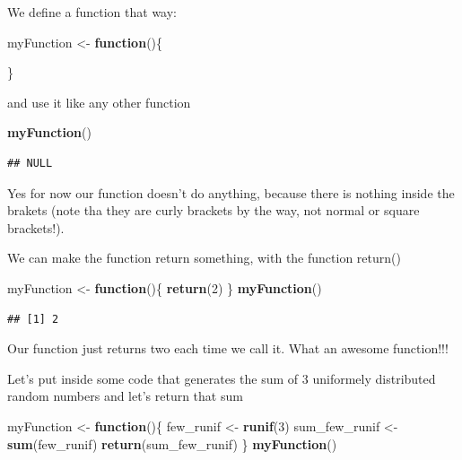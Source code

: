 \documentclass[]{book}
\newenvironment{Shaded}{\begin{snugshade}}{\end{snugshade}}
\newcommand{\ControlFlowTok}[1]{\textcolor[rgb]{0.13,0.29,0.53}{\textbf{#1}}}
\newcommand{\DecValTok}[1]{\textcolor[rgb]{0.00,0.00,0.81}{#1}}
\newcommand{\KeywordTok}[1]{\textcolor[rgb]{0.13,0.29,0.53}{\textbf{#1}}}
\newcommand{\NormalTok}[1]{#1}
\newcommand{\StringTok}[1]{\textcolor[rgb]{0.31,0.60,0.02}{#1}}
\begin{document}
We define a function that way:

\begin{Shaded}
\begin{Highlighting}[]
\NormalTok{myFunction <-}\StringTok{ }\ControlFlowTok{function}\NormalTok{()\{}
  
\NormalTok{\}}
\end{Highlighting}
\end{Shaded}

and use it like any other function

\begin{Shaded}
\begin{Highlighting}[]
\KeywordTok{myFunction}\NormalTok{()}
\end{Highlighting}
\end{Shaded}

\begin{verbatim}
## NULL
\end{verbatim}

Yes for now our function doesn't do anything, because there is nothing inside the brakets (note tha they are curly brackets by the way, not normal or square brackets!).

We can make the function return something, with the function return()

\begin{Shaded}
\begin{Highlighting}[]
\NormalTok{myFunction <-}\StringTok{ }\ControlFlowTok{function}\NormalTok{()\{}
  \KeywordTok{return}\NormalTok{(}\DecValTok{2}\NormalTok{)}
\NormalTok{\}}
\KeywordTok{myFunction}\NormalTok{()}
\end{Highlighting}
\end{Shaded}

\begin{verbatim}
## [1] 2
\end{verbatim}

Our function just returns two each time we call it. What an awesome function!!!

Let's put inside some code that generates the sum of 3 uniformely distributed random numbers and let's return that sum

\begin{Shaded}
\begin{Highlighting}[]
\NormalTok{myFunction <-}\StringTok{ }\ControlFlowTok{function}\NormalTok{()\{}
\NormalTok{  few_runif <-}\StringTok{ }\KeywordTok{runif}\NormalTok{(}\DecValTok{3}\NormalTok{)}
\NormalTok{  sum_few_runif <-}\StringTok{ }\KeywordTok{sum}\NormalTok{(few_runif)}
  \KeywordTok{return}\NormalTok{(sum_few_runif)}
\NormalTok{\}}
\KeywordTok{myFunction}\NormalTok{()}
\end{Highlighting}
\end{Shaded}
\end{document}
